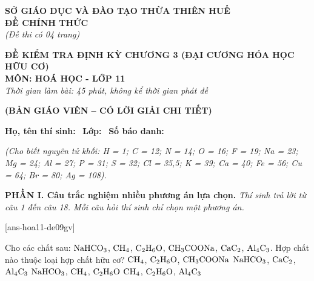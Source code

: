 \documentclass[12pt,a4paper]{article}
\begin{document}
\thispagestyle{firstpage}

\noindent
\begin{minipage}[t]{0.44\textwidth}
	\centering\fontsize{10pt}{12pt}\selectfont
	\textbf{SỞ GIÁO DỤC VÀ ĐÀO TẠO THỪA THIÊN HUẾ}\\
	\textbf{ĐỀ CHÍNH THỨC}\\
	\textit{(Đề thi có 04 trang)}
\end{minipage}\hfill
\begin{minipage}[t]{0.54\textwidth}
	\centering\fontsize{10.5pt}{13pt}\selectfont
	\textbf{ĐỀ KIỂM TRA ĐỊNH KỲ CHƯƠNG 3 (ĐẠI CƯƠNG HÓA HỌC HỮU CƠ)}\\
	\textbf{MÔN: HOÁ HỌC - LỚP 11}\\
	\textit{Thời gian làm bài: 45 phút, không kể thời gian phát đề}
	
	\smallskip
\end{minipage}

\smallskip
\begin{center}
	{\color{hfRed}\textbf{\large (BẢN GIÁO VIÊN -- CÓ LỜI GIẢI CHI TIẾT)}}
\end{center}

\smallskip
\noindent\hrulefill
\smallskip

\noindent\textbf{Họ, tên thí sinh:} \dotfill\ \textbf{Lớp:} \dotfill\ \textbf{Số báo danh:} \dotfill

\smallskip
\noindent\textit{(Cho biết nguyên tử khối: H = 1; C = 12; N = 14; O = 16; F = 19; Na = 23; Mg = 24; Al = 27; P = 31; S = 32; Cl = 35,5; K = 39; Ca = 40; Fe = 56; Cu = 64; Br = 80; Ag = 108).}
\smallskip

\noindent\textbf{\large PHẦN I. Câu trắc nghiệm nhiều phương án lựa chọn.}
\textit{Thí sinh trả lời từ câu 1 đến câu 18. Mỗi câu hỏi thí sinh chỉ chọn một phương án.}
\vspace{0.2cm}

[ans-hoa11-de09gv]

\begin{ex}
Cho các chất sau: $\ce{NaHCO3}$, $\ce{CH4}$, $\ce{C2H6O}$, $\ce{CH3COONa}$, $\ce{CaC2}$, $\ce{Al4C3}$. Hợp chất nào thuộc loại hợp chất hữu cơ?
\choice
{\True $\ce{CH4}$, $\ce{C2H6O}$, $\ce{CH3COONa}$}
{$\ce{NaHCO3}$, $\ce{CaC2}$, $\ce{Al4C3}$}
{$\ce{NaHCO3}$, $\ce{CH4}$, $\ce{C2H6O}$}
{$\ce{CH4}$, $\ce{C2H6O}$, $\ce{Al4C3}$}

\end{ex}
\end{document}
